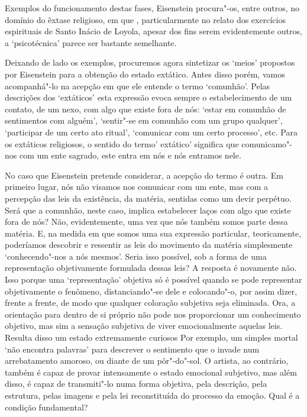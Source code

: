 Exemplos do funcionamento destas fases, Eisenstein procura"-os, entre
outros, no domínio do êxtase religioso, em que , particularmente no
relato dos exercícios espirituais de Santo Inácio de Loyola, apesar dos
fins serem evidentemente outros, a `psicotécnica' parece ser bastante
semelhante.

Deixando de lado os exemplos, procuremos agora sintetizar os `meios'
propostos por Eisenstein para a obtenção do estado extático. Antes disso
porém, vamos acompanhá"-lo na acepção em que ele entende o termo
`comunhão'. Pelas descrições dos `extáticos' esta expressão evoca sempre
o estabelecimento de um contato, de um nexo, com algo que existe fora de
nós: `estar em comunhão de sentimentos com alguém', `sentir"-se em
comunhão com um grupo qualquer', `participar de um certo ato ritual',
`comunicar com um certo processo', etc. Para os extáticos religiosos, o
sentido do termo' extático' significa que comunicamo"-nos com um ente
sagrado, este entra em nós e nós entramos nele.

No caso que Eisenstein pretende considerar, a acepção do termo é outra.
Em primeiro lugar, nós não visamos nos comunicar com um ente, mas com a
percepção das leis da existência, da matéria, sentidas como um devir
perpétuo. Será que a comunhão, neste caso, implica estabelecer laços com
algo que existe fora de nós? Não, evidentemente, uma vez que nós também
somos parte dessa matéria. E, na medida em que somos uma sua expressão
particular, teoricamente, poderíamos descobrir e ressentir as leis do
movimento da matéria simplesmente `conhecendo"-nos a nós mesmos'. Seria
isso possível, sob a forma de uma representação objetivamente formulada
dessas leis? A resposta é novamente não. Isso porque uma `representação'
objetiva só é possível quando se pode representar objetivamente o
fenômeno, distanciando"-se dele e colocando"-o, por assim dizer, frente a
frente, de modo que qualquer coloração subjetiva seja eliminada. Ora, a
orientação para dentro de si próprio não pode nos proporcionar um
conhecimento objetivo, mas sim a sensação subjetiva de viver
emocionalmente aquelas leis. Resulta disso um estado extremamente
curiosos Por exemplo, um simples mortal `não encontra palavras' para
descrever o sentimento que o invade num arrebatamento amoroso, ou diante
de um pôr"-do"-sol. O artista, ao contrário, também é capaz de provar
intensamente o estado emocional subjetivo, mas além disso, é capaz de
transmiti"-lo numa forma objetiva, pela descrição, pela estrutura, pelas
imagens e pela lei reconstituída do processo da emoção. Qual é a
condição fundamental?

